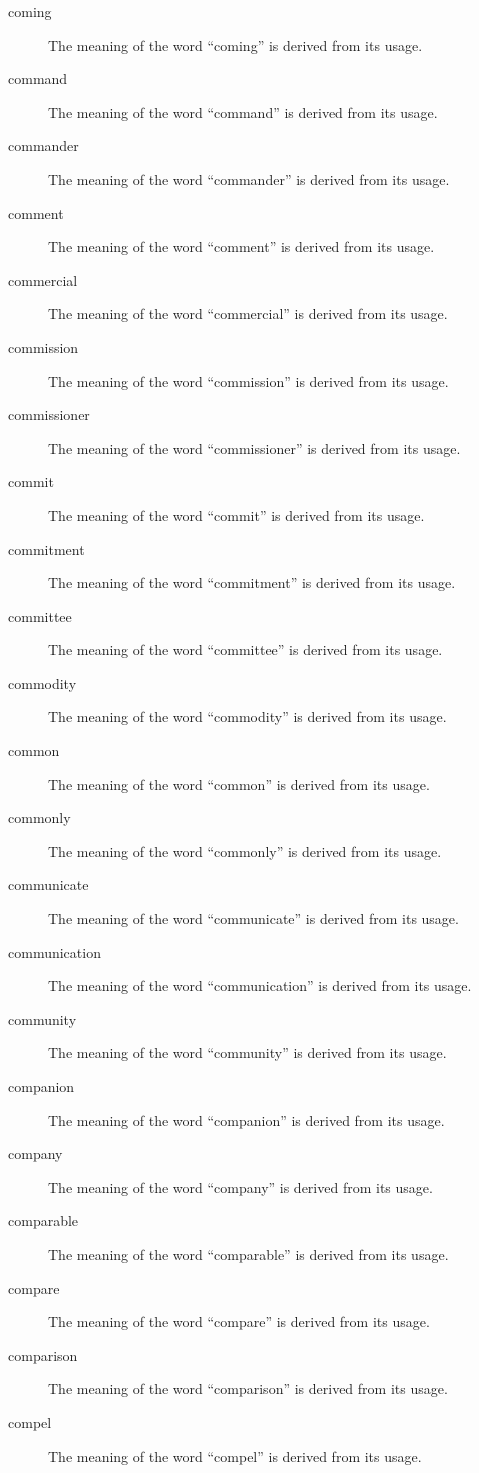 \documentclass[12pt, letterpaper]{memoir}
\begin{document}
\begin{description}
\item[coming] The meaning of the word ``coming'' is derived from its usage.
\item[command] The meaning of the word ``command'' is derived from its usage.
\item[commander] The meaning of the word ``commander'' is derived from its usage.
\item[comment] The meaning of the word ``comment'' is derived from its usage.
\item[commercial] The meaning of the word ``commercial'' is derived from its usage.
\item[commission] The meaning of the word ``commission'' is derived from its usage.
\item[commissioner] The meaning of the word ``commissioner'' is derived from its usage.
\item[commit] The meaning of the word ``commit'' is derived from its usage.
\item[commitment] The meaning of the word ``commitment'' is derived from its usage.
\item[committee] The meaning of the word ``committee'' is derived from its usage.
\item[commodity] The meaning of the word ``commodity'' is derived from its usage.
\item[common] The meaning of the word ``common'' is derived from its usage.
\item[commonly] The meaning of the word ``commonly'' is derived from its usage.
\item[communicate] The meaning of the word ``communicate'' is derived from its usage.
\item[communication] The meaning of the word ``communication'' is derived from its usage.
\item[community] The meaning of the word ``community'' is derived from its usage.
\item[companion] The meaning of the word ``companion'' is derived from its usage.
\item[company] The meaning of the word ``company'' is derived from its usage.
\item[comparable] The meaning of the word ``comparable'' is derived from its usage.
\item[compare] The meaning of the word ``compare'' is derived from its usage.
\item[comparison] The meaning of the word ``comparison'' is derived from its usage.
\item[compel] The meaning of the word ``compel'' is derived from its usage.

\end{description}
\end{document}
